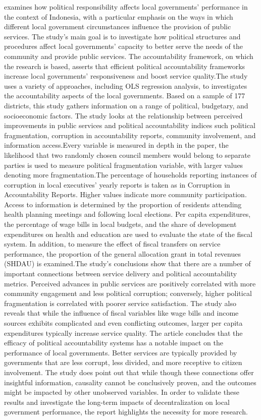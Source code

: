   examines how political responsibility affects local governments' performance in the context of Indonesia, with a particular emphasis on the ways in which different local government circumstances influence the provision of public services. The study's main goal is to investigate how political structures and procedures affect local governments' capacity to better serve the needs of the community and provide public services. The accountability framework, on which the research is based, asserts that efficient political accountability frameworks increase local governments' responsiveness and boost service quality.The study uses a variety of approaches, including OLS regression analysis, to investigates the accountability aspects of the local governments. Based on a sample of 177 districts, this study gathers information on a range of political, budgetary, and socioeconomic factors. The study looks at the relationship between perceived improvements in public services and political accountability indices such political fragmentation, corruption in accountability reports, community involvement, and information access.Every variable is measured in depth in the paper, the likelihood that two randomly chosen council members would belong to separate parties is used to measure political fragmentation variable, with larger values denoting more fragmentation.The percentage of households reporting instances of corruption in local executives' yearly reports is taken as in Corruption in Accountability Reports. Higher values indicate more community participation. Access to information is determined by the proportion of residents attending health planning meetings and following local elections. Per capita expenditures, the percentage of wage bills in local budgets, and the share of development expenditures on health and education are used to evaluate the state of the fiscal system. In addition, to measure the effect of fiscal transfers on service performance, the proportion of the general allocation grant in total revenues (SHDAU) is examined.The study's conclusions show that there are a number of important connections between service delivery and political accountability metrics. Perceived advances in public services are positively correlated with more community engagement and less political corruption; conversely, higher political fragmentation is correlated with poorer service satisfaction. The study also reveals that while the influence of fiscal variables like wage bills and income sources exhibits complicated and even conflicting outcomes, larger per capita expenditures typically increase service quality. The article concludes that the efficacy of political accountability systems has a notable impact on the performance of local governments. Better services are typically provided by governments that are less corrupt, less divided, and more receptive to citizen involvement. The study does point out that while though these connections offer insightful information, causality cannot be conclusively proven, and the outcomes might be impacted by other unobserved variables. In order to validate these results and investigate the long-term impacts of decentralization on local government performance, the report highlights the necessity for more research.\\
